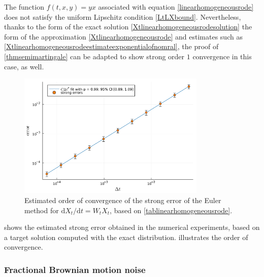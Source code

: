 \documentclass[reqno,12pt]{amsart}
\theoremstyle{plain} %
\theoremstyle{definition} %
\begin{document}
The function $f(t, x, y) = yx$ associated with equation \cref{linearhomogeneousrode} does not satisfy the uniform Lipschitz condition \cref{LtLXbound}. Nevertheless, thanks to the form of the exact solution \cref{Xtlinearhomogeneousrodesolution} the form of the approximation \cref{Xtlinearhomogeneousrode} and estimates such as \cref{Xtlinearhomogeneousrodeestimateexponentialofnomral}, the proof of \cref{thmsemimartingale} can be adapted to show strong order $1$ convergence in this case, as well.

\begin{figure}[htb]
    \centerline{\includegraphics[width=0.8\textwidth]{img/order_wiener_linearhomogenous.pdf}}
    \caption{Estimated order of convergence of the strong error of the Euler method for $\mathrm{d}X_t/\mathrm{d}t = W_t X_t$, based on \cref{tablinearhomogeneousrode}.}
    \label{figlinearhomogeneousrode}
\end{figure}

 shows the estimated strong error obtained in the numerical experiments, based on a target solution computed with the exact distribution.  illustrates the order of convergence.

\subsubsection{Fractional Brownian motion noise}
\label{secfBmnoise}
\end{document}
